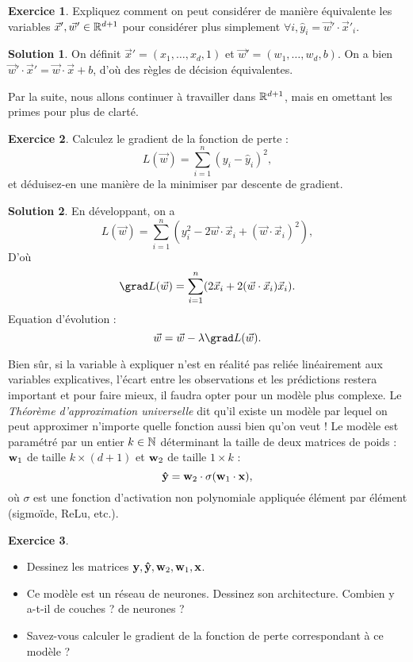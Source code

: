 \documentclass[a4paper,francais]{article}
\newcommand{\N}{{\ensuremath\mathbb{N}}}
\newcommand{\R}{{\ensuremath\mathbb{R}}}
\theoremstyle{definition}
\newtheorem{exercice}{Exercice}[section]
\newtheorem*{solution}{Solution}
\begin{document}
\begin{exercice}
  Expliquez comment on peut considérer de manière équivalente
  les variables $\vec{x}', \vec{w}' \in \R^{d+1}$ pour considérer
  plus simplement $\forall i, \hat{y}_i = \vec{w}' \cdot \vec{x}'_i.$
\end{exercice}

\begin{solution}
  On définit $\vec{x}' = (x_1, \dots, x_d, 1)$ et
  $\vec{w}' = (w_1, \dots, w_d, b)$. On a bien
  $\vec{w}'\cdot\vec{x}' = \vec{w}\cdot\vec{x} + b$,
  d'où des règles de décision équivalentes. 
\end{solution}

Par la suite, nous allons continuer à travailler dans $\R^{d+1}$,
mais en omettant les primes pour plus de clarté. 

\begin{exercice}
  Calculez le gradient de la fonction de perte :
  \[ L(\vec{w}) = \sum_{i=1}^{n} (y_i - \hat{y}_i)^2, \]
  et déduisez-en une manière de la minimiser par descente de gradient.
\end{exercice}

\begin{solution}
  En développant, on a
  \[ L(\vec{w}) = \sum_{i=1}^{n} ( y_i^2 - 2\vec{w} \cdot \vec{x}_i + (\vec{w} \cdot \vec{x}_i)^2 ), \]
  D'où
  \[ \grad L(\vec{w}) = \sum_{i=1}^{n} ( 2\vec{x}_i + 2(\vec{w} \cdot \vec{x}_i)\vec{x}_i ). \]
  Equation d'évolution :
  \[ \vec{w} = \vec{w} - \lambda \grad L(\vec{w}). \]
\end{solution}

Bien sûr, si la variable à expliquer n'est en réalité pas reliée
linéairement aux variables explicatives, l'écart entre les observations
et les prédictions restera important et pour faire mieux, il
faudra opter pour un modèle plus complexe. Le \emph{Théorème
d'approximation universelle} dit qu'il existe un modèle par lequel
on peut approximer n'importe quelle fonction aussi bien qu'on veut !
Le modèle est paramétré par un entier $k \in \N$ déterminant la taille
de deux matrices de poids : $\mathbf{w}_1$ de taille $k \times (d+1)$ et
$\mathbf{w}_2$ de taille $1 \times k$ :
\[ \mathbf{\hat{y}} = \mathbf{w}_2 \cdot \sigma ( \mathbf{w}_1 \cdot \mathbf{x} ), \]
où $\sigma$ est une fonction d'activation non polynomiale appliquée
élément par élément (sigmoïde, ReLu, etc.). 

\begin{exercice}
  ~
  
  \begin{itemize}
  \item Dessinez les matrices $\mathbf{y},\mathbf{\hat{y}},\mathbf{w}_2, \mathbf{w}_1, \mathbf{x}$. 
  \item Ce modèle est un réseau de neurones. Dessinez son architecture.
    Combien y a-t-il de couches ? de neurones ?
  \item Savez-vous calculer le gradient de la fonction de perte correspondant à ce modèle ?
  \end{itemize}
\end{exercice}
\end{document}
